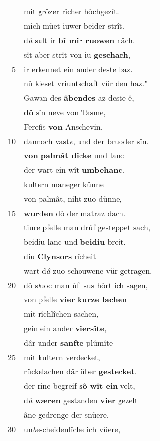 \documentclass[8pt,a4paper,notitlepage]{article}
\begin{document}
\begin{table}[ht]
\begin{minipage}[t]{0.5\linewidth}
\begin{tabular}{rl}
 & mit grôzer rîcher hôchgezît.\\ 
 & mich müet iuwer beider strît.\\ 
 & d\textit{â} sult ir \textbf{bî mir ruowen} nâch.\\ 
 & sît aber strît von iu \textbf{geschach},\\ 
5 & ir erkennet ein ander deste baz.\\ 
 & nû kieset vriuntschaft vür den haz."\\ 
 & Gawan des \textbf{âbendes} az deste ê,\\ 
 & \textbf{dô} sîn neve von Tasme,\\ 
 & Ferefis \textbf{von} Anschevin,\\ 
10 & dannoch vast\textit{e}, und der bruoder sîn.\\ 
 & \textbf{von palmât dicke} und lanc\\ 
 & der wart ein wît \textbf{umbehanc}.\\ 
 & kultern maneger künne\\ 
 & von palmât, niht zuo dünne,\\ 
15 & \textbf{wurden} dô der matraz dach.\\ 
 & tiure pfelle man drûf gesteppet sach,\\ 
 & beidiu lanc und \textbf{beidiu} breit.\\ 
 & diu \textbf{Clynsors} rîcheit\\ 
 & wart d\textit{â} zuo schouwene vür getragen.\\ 
20 & dô s\textit{l}uoc man ûf, sus hôrt ich sagen,\\ 
 & von pfelle \textbf{vier} \textbf{kurze lachen}\\ 
 & mit rîchlîchen sachen,\\ 
 & gein ein ander \textbf{viersîte},\\ 
 & dâr under \textbf{sanfte} plûmîte\\ 
25 & mit kultern verdecket,\\ 
 & rückelachen dâr über \textbf{gestecket}.\\ 
 & der rinc begreif \textbf{sô wît ein} velt,\\ 
 & d\textit{â} \textbf{wæren} gestanden \textbf{vier} gezelt\\ 
 & âne gedrenge der snüere.\\ 
30 & un\textit{b}escheidenlîche ich vüere,\\ 
\end{tabular}
\scriptsize

\end{minipage}
\end{table}
\end{document}
